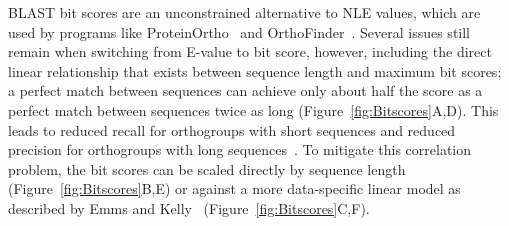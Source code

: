 \documentclass[twocolumn]{bmcart}  %
\begin{document}
BLAST bit scores are an unconstrained alternative to NLE values, which are used by programs like ProteinOrtho~\cite{Lechner:2011jk} and OrthoFinder~\cite{Emms:2015ig}.
Several issues still remain when switching from E-value to bit score, however, including the direct linear relationship that exists between sequence length and maximum bit scores;
a perfect match between sequences can achieve only about half the score as a perfect match between sequences twice as long (Figure~\ref{fig:Bitscores}A,D).
This leads to reduced recall for orthogroups with short sequences and reduced precision for orthogroups with long sequences~\cite{Emms:2015ig}.
To mitigate this correlation problem, the bit scores can be scaled directly by sequence length (Figure~\ref{fig:Bitscores}B,E) or against a more data-specific linear model as described by Emms and Kelly~\cite{Emms:2015ig} (Figure~\ref{fig:Bitscores}C,F).
\end{document}
